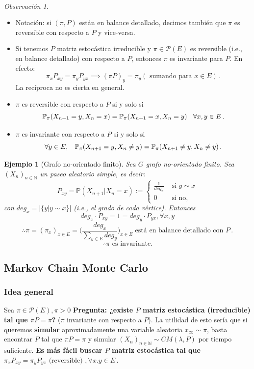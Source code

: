 \documentclass[letterpaper,11pt]{article} %
\def\espacio{\hspace{.25cm}\,}
\theoremstyle{defbreak}
\newtheorem{example}{Ejemplo}[subsection]
\theoremstyle{propbreak}
\theoremstyle{remark}
\newtheorem{remark}{Observación}[subsection]
\theoremstyle{break}
\def\ssi{\Longleftrightarrow}
\def\P{\mathbb{P}}
\def\N{\mathbb{N}}
\def\beforeitemize{\leavevmode \vspace{-0.5\baselineskip}}
\def\cm{CM(\lambda,P)}
\begin{document}
\vspace{.5cm}\\
\begin{remark}
\beforeitemize
\begin{itemize}
    \item Notación: si $(\pi,P)$ están en balance detallado, decimos también que $\pi$ es reversible con respecto a $P$ y vice-versa.
    \item Si tenemos $P$ matriz estocástica irreducible y $\pi\in\mathcal{P}(E)$ es reversible (i.e., en balance detallado) con respecto a $P$,  entonces $\pi$ es invariante para $P$. En efecto: 
    $$ \pi_xP_{xy}=\pi_yP_{yx}\implies (\pi P)_y=\pi_y (\mbox{ sumando para }x\in E)\, .$$
    La recíproca no es cierta en general.
    \item $\pi$ es reversible con respecto a $P$ si y solo si  $$\P_\pi(X_{n+1}=y,X_n=x)=\P_\pi(X_{n+1}=x,X_n=y)\espacio \forall x, y \in E \,.$$
    \item $\pi$ es invariante con respecto a $P$ si y solo si %
    $$\forall y \in E,\espacio \P_\pi(X_{n+1}=y,X_n\neq y)=\P_\pi(X_{n+1}\neq y,X_n\neq y)\,.$$
\end{itemize}
\end{remark}
\begin{example}[Grafo no-orientado finito]
Sea $G$ grafo no-orientado finito. Sea $(X_n)_{n\in\N}$ un paseo aleatorio simple, es decir: 
$$ P_{xy}=\P(X_{n+1}|X_n=x):=\begin{cases}
\frac{1}{deg_x}   & \mbox{ si }y\sim x\\
0   & \mbox{ si no,}
\end{cases}$$
con $deg_x=|\{y|y\sim x\}|$ (i.e., el grado de cada vértice). Entonces
$$ deg_x\cdot P_{xy}=1=deg_y \cdot P_{yx}, \forall x,y$$
$$ \therefore \pi=(\pi_x)_{x\in E}=\displaystyle\bigg(\frac{deg_x}{\sum_{y\in E}deg_y}\bigg)_{x\in E} \mbox{ está en balance detallado con }P \, .$$
$$ \therefore \pi \mbox{ es invariante.}$$
\end{example}
\subsection{Markov Chain Monte Carlo}
\subsubsection{Idea general}
Sea $\pi\in \mathcal{P}(E),\pi>0$
\newline \textbf{Pregunta: ¿existe $P$ matriz estocástica (irreducible) tal que $\pi P=\pi$?} ($\pi$ invariante con respecto a $P$).
\newp La utilidad de esto sería que si queremos \textbf{simular} aproximadamente una variable aleatoria $x_\infty\sim\pi$, basta encontrar $P$ tal que $\pi P=\pi$ y simular $(X_n)_{n\in\N}\sim \cm$ por tiempo suficiente.
\newline \textbf{Es más fácil buscar $P$ matriz estocástica tal que $\pi_xP_{xy}=\pi_yP_{yx} \mbox{ (reversible) }, \forall x.y\in E$}\,.
\end{document}
